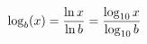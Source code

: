 \documentclass[preview]{standalone}
\begin{document}
\begin{align*}
\special{dvisvgm:raw <g id='unique000'>}\log_b(x) = \frac{\ln x}{\ln b} = \frac{\log_{10} x}{\log_{10} b}\special{dvisvgm:raw </g>}
\end{align*}
\end{document}
